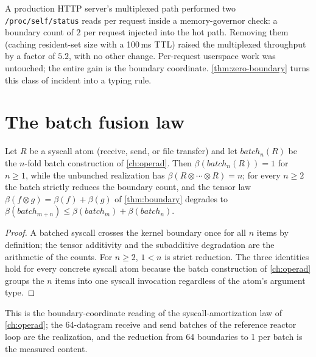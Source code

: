 \begin{remark}
A production HTTP server's multiplexed path performed two
\texttt{/proc/self/status} reads per request inside a memory-governor
check: a boundary count of $2$ per request injected into the hot path.
Removing them (caching resident-set size with a 100\,ms TTL) raised the
multiplexed throughput by a factor of $5.2$, with no other change.
Per-request userspace work was untouched; the entire gain is the
boundary coordinate. \autoref{thm:zero-boundary} turns this class of
incident into a typing rule.
\end{remark}

\section{The batch fusion law}\label{sec:batch-law}

\begin{theorem}\label{thm:57}\label{thm:batch}
Let $R$ be a syscall atom (receive, send, or file transfer) and let
$\mathit{batch}_n (R)$ be the $n$-fold batch construction of
\autoref{ch:operad}. Then $\beta (\mathit{batch}_n (R)) = 1$ for
$n \geq 1$, while the unbunched realization has
$\beta (R \otimes \cdots \otimes R) = n$; for every $n \geq 2$ the batch
strictly reduces the boundary count, and the tensor law
$\beta (f \otimes g) = \beta (f) + \beta (g)$ of \autoref{thm:boundary}
degrades to
$\beta (\mathit{batch}_{m+n}) \leq \beta (\mathit{batch}_m) +
\beta (\mathit{batch}_n)$.
\end{theorem}

\begin{proof}
A batched syscall crosses the kernel boundary once for all $n$ items by
definition; the tensor additivity and the subadditive degradation are
the arithmetic of the counts. For $n \geq 2$, $1 < n$ is strict
reduction. The three identities hold for every concrete syscall atom
because the batch construction of \autoref{ch:operad} groups the $n$
items into one syscall invocation regardless of the atom's argument
type.
\end{proof}

\begin{remark}
This is the boundary-coordinate reading of the syscall-amortization law
of \autoref{ch:operad}; the 64-datagram receive and send batches of the
reference reactor loop are the realization, and the reduction from 64
boundaries to 1 per batch is the measured content.
\end{remark}

